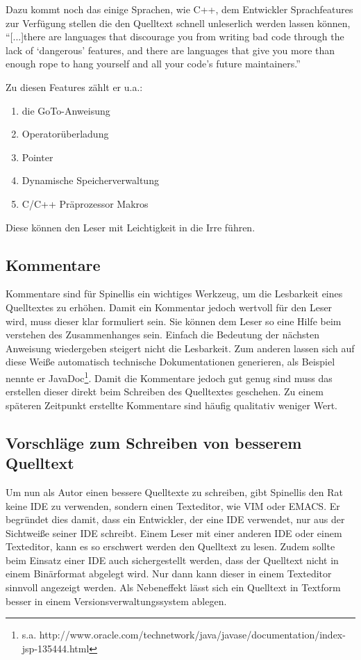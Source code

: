 Dazu kommt noch das einige Sprachen, wie C++, dem Entwickler Sprachfeatures zur Verfügung stellen die den Quelltext schnell unleserlich werden lassen können, \enquote{[...]there are languages that discourage you from writing bad code through the lack of \enquote{dangerous} features, and there are languages that give you more than enough rope to hang yourself and all your code’s future maintainers.}\cite[S. 87]{Spinellis}

Zu diesen Features zählt er u.a.:
\begin{enumerate}
\item die GoTo-Anweisung
\item Operatorüberladung
\item Pointer
\item Dynamische Speicherverwaltung 
\item C/C++ Präprozessor Makros
\end{enumerate}

Diese können den Leser mit Leichtigkeit in die Irre führen.

\subsection{Kommentare}
Kommentare sind für Spinellis ein wichtiges Werkzeug, um die Lesbarkeit eines Quelltextes zu erhöhen. Damit ein Kommentar jedoch wertvoll für den Leser wird, muss dieser klar formuliert sein. Sie können dem Leser so eine Hilfe beim verstehen des Zusammenhanges sein. Einfach die Bedeutung der nächsten Anweisung wiedergeben steigert nicht die Lesbarkeit. Zum anderen lassen sich auf diese Weiße automatisch technische Dokumentationen generieren, als Beispiel nennte er JavaDoc\footnote{s.a. http://www.oracle.com/technetwork/java/javase/documentation/index-jsp-135444.html}. Damit die Kommentare jedoch gut genug sind muss das erstellen dieser direkt beim Schreiben des Quelltextes geschehen. Zu einem späteren Zeitpunkt erstellte Kommentare sind häufig qualitativ weniger Wert. \cite[S. 88]{Spinellis}

\subsection{Vorschläge zum Schreiben von besserem Quelltext}
Um nun als Autor einen bessere Quelltexte zu schreiben, gibt Spinellis den Rat keine IDE zu verwenden, sondern einen Texteditor, wie VIM oder EMACS. Er begründet dies damit, dass ein Entwickler, der eine IDE verwendet, nur aus der Sichtweiße seiner IDE schreibt. Einem Leser mit einer anderen IDE oder einem Texteditor, kann es so erschwert werden den Quelltext zu lesen. Zudem sollte beim Einsatz einer IDE auch sichergestellt werden, dass der Quelltext nicht in einem Binärformat abgelegt wird. Nur dann kann dieser in einem Texteditor sinnvoll angezeigt werden. Als Nebeneffekt lässt sich ein Quelltext in Textform besser in einem Versionsverwaltungssystem ablegen. \cite[S. 88]{Spinellis}


